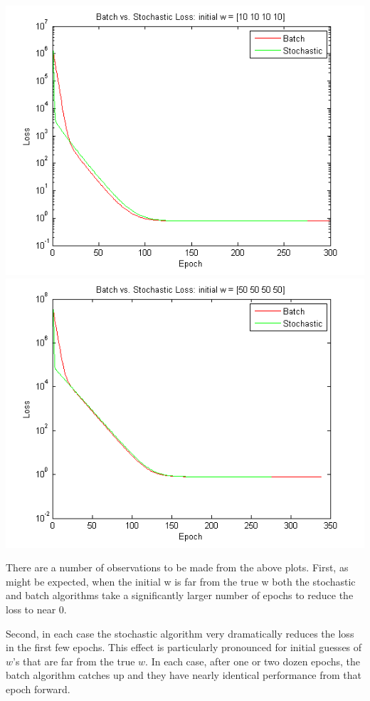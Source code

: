 \documentclass{article}
\begin{document}
\includegraphics[scale=0.75]{regression_10.png}
\includegraphics[scale=0.75]{regression_50.png}

There are a number of observations to be made from the above plots. First, as might be expected, when the initial w is far from the true w both the stochastic and batch algorithms take a significantly larger number of epochs to reduce the loss to near 0.

Second, in each case the stochastic algorithm very dramatically reduces the loss in the first few epochs. This effect is particularly pronounced for initial guesses of $w$'s that are far from the true $w$. In each case, after one or two dozen epochs, the batch algorithm catches up and they have nearly identical performance from that epoch forward.
\end{document}
